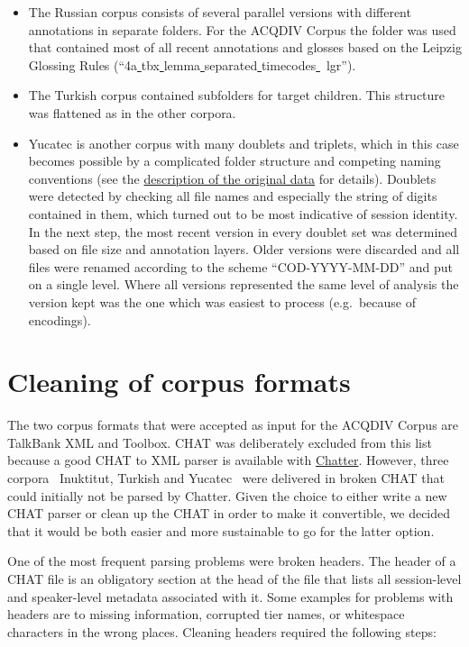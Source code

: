 \documentclass[a4paper, 11pt]{book}
\newcommand{\und}{\underline{{ }}\hspace{0.2mm}}	%
\begin{document}
\begin{itemize}
	\item The Russian corpus consists of several parallel versions with different annotations in separate folders. For the ACQDIV Corpus the folder was used that contained most of all recent annotations and glosses based on the Leipzig Glossing Rules (“4a\und tbx\und lemma\und separated\und timecodes\und\ lgr”). 
	\item The Turkish corpus contained subfolders for target children. This structure was flattened as in the other corpora. 
	\item Yucatec is another corpus with many doublets and triplets, which in this case becomes possible by a complicated folder structure and competing naming conventions (see the \hyperref[subsec: Yucatec file system and formats]{description of the original data} for details). Doublets were detected by checking all file names and especially the string of digits contained in them, which turned out to be most indicative of session identity. In the next step, the most recent version in every doublet set was determined based on file size and annotation layers. Older versions were discarded and all files were renamed according to the scheme “COD-YYYY-MM-DD” and put on a single level. Where all versions represented the same level of analysis the version kept was the one which was easiest to process (e.g.\ because of encodings). 
\end{itemize}


\section{Cleaning of corpus formats}
\label{sec:Cleaning of corpus formats}

The two corpus formats that were accepted as input for the ACQDIV Corpus are TalkBank XML and Toolbox. CHAT was deliberately excluded from this list because a good CHAT to XML parser is available with \href{http://talkbank.org/software/chatter.html}{Chatter}. However, three corpora \textendash\ Inuktitut, Turkish and Yucatec \textendash\ were delivered in broken CHAT that could initially not be parsed by Chatter. Given the choice to either write a new CHAT parser or clean up the CHAT in order to make it convertible, we decided that it would be both easier and more sustainable to go for the latter option. 

One of the most frequent parsing problems were broken headers. The header of a CHAT file is an obligatory section at the head of the file that lists all session-level and speaker-level metadata associated with it. Some examples for problems with headers are to missing information, corrupted tier names, or whitespace characters in the wrong places. Cleaning headers required the following steps: 
\end{document}
